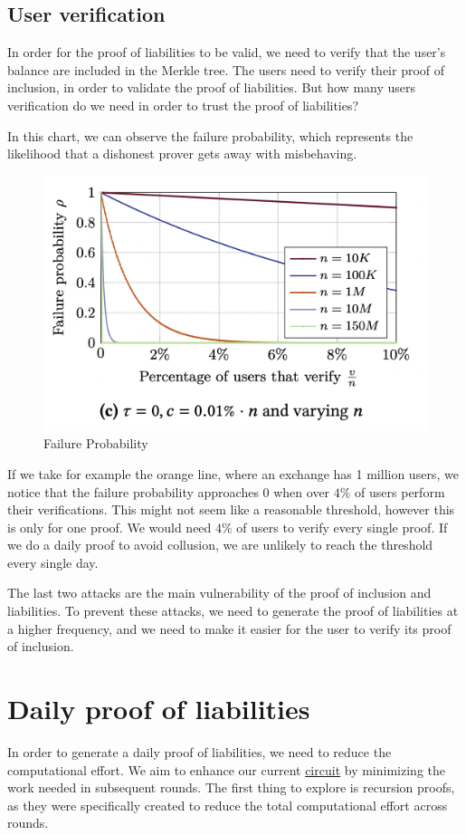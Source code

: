\subsection{User verification}
In order for the proof of liabilities to be valid, we need to verify that the user's balance are included in the Merkle tree. 
The users need to verify their proof of inclusion, in order to validate the proof of liabilities. 
But how many users verification do we need in order to trust the proof of liabilities?

In this chart, we can observe the failure probability, which represents the likelihood that a dishonest prover gets away with misbehaving.
\begin{figure}[H]
   \centering
   \includegraphics[width=130mm]{FailureProbability.png}
   \caption{Failure Probability \cite{GP21}}
   \label{FB}
   \end{figure}
If we take for example the orange line, where an exchange has 1 million users, we notice that the failure probability approaches 0 when over $4\%$ of users perform their verifications.
This might not seem like a reasonable threshold, however this is only for one proof. We would need $4\%$ of users to verify every single proof. 
If we do a daily proof to avoid collusion, we are unlikely to reach the threshold every single day.

The last two attacks are the main vulnerability of the proof of inclusion and liabilities. 
To prevent these attacks, we need to generate the proof of liabilities at a higher frequency, and we need to make it easier for the user to verify its proof of inclusion.

\section{Daily proof of liabilities}
In order to generate a daily proof of liabilities, we need to reduce the computational effort.
We aim to enhance our current \hyperref[subsec:pl]{circuit} by minimizing the work needed in subsequent rounds.
The first thing to explore is recursion proofs, as they were specifically created to reduce the total computational effort across rounds.

